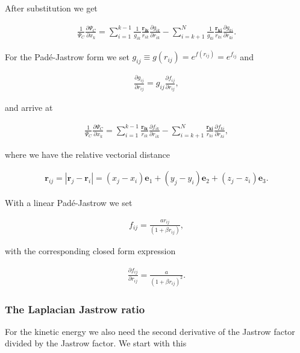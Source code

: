 			After substitution we get

			\begin{align}
				\frac{1}{\Psi_{C}}\frac{\partial\Psi_{C}}{\partial x_{k}}=\sum_{i=1}^{k-1}\frac{1}{g_{ik}}\frac{\mathbf{r_{ik}}}{r_{ik}}\frac{\partial g_{ik}}{\partial r_{ik}}-\sum_{i=k+1}^{N}\frac{1}{g_{ki}}\frac{\mathbf{r_{ki}}}{r_{ki}}\frac{\partial g_{ki}}{\partial r_{ki}}.
			\end{align}

			For the Padé-Jastrow form we set $\ensuremath{g_{ij}\equiv g(r_{ij})=e^{f(r_{ij})}=e^{f_{ij}}}$
			and

			\begin{align}
				\frac{\partial g_{ij}}{\partial r_{ij}}=g_{ij}\frac{\partial f_{ij}}{\partial r_{ij}},
			\end{align}

			and arrive at

			\begin{align}
				\frac{1}{\Psi_{C}}\frac{\partial\Psi_{C}}{\partial x_{k}}=\sum_{i=1}^{k-1}\frac{\mathbf{r_{ik}}}{r_{ik}}\frac{\partial f_{ik}}{\partial r_{ik}}-\sum_{i=k+1}^{N}\frac{\mathbf{r_{ki}}}{r_{ki}}\frac{\partial f_{ki}}{\partial r_{ki}}, \label{eq:gradient_ratio_Jastrow}
			\end{align}

			where we have the relative vectorial distance

			\begin{align}
				\mathbf{r}_{ij}=|\mathbf{r}_{j}-\mathbf{r}_{i}|=(x_{j}-x_{i})\mathbf{e}_{1}+(y_{j}-y_{i})\mathbf{e}_{2}+(z_{j}-z_{i})\mathbf{e}_{3}.
			\end{align}

			With a linear Padé-Jastrow we set

			\begin{align}
				f_{ij}=\frac{ar_{ij}}{(1+\beta r_{ij})},
			\end{align}

			with the corresponding closed form expression

			\begin{align}
				\frac{\partial f_{ij}}{\partial r_{ij}}=\frac{a}{(1+\beta r_{ij})^{2}}.
			\end{align}

		\subsubsection{The Laplacian Jastrow ratio}
			For the kinetic energy we also need the second derivative of the Jastrow
			factor divided by the Jastrow factor. We start with this

